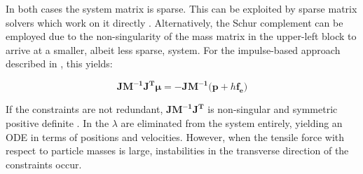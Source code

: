 \documentclass{article}
\begin{document}
In both cases the system matrix is sparse. This can be exploited by sparse matrix solvers which work on it directly \cite{baraff1996}.
Alternatively, the Schur complement can be employed due to the non-singularity of the mass matrix in the upper-left block to arrive
at a smaller, albeit less sparse, system. For the impulse-based approach described in \cite{tournier2015}, this yields:

\[
    \bm{JM^{-1}J^T \mu} = \bm{-JM^{-1}(p + } h \bm{f_e)}
\]

If the constraints are not redundant, $\bm{JM^{-1}J^T}$ is non-singular and symmetric positive definite \cite{baraff1996}. In 
\cite{ascher1995} the $\lambda$ are eliminated from the system entirely, yielding an ODE in terms of positions and velocities. However,
when the tensile force with respect to particle masses is large, instabilities in the transverse direction of the constraints occur.




\end{document}
